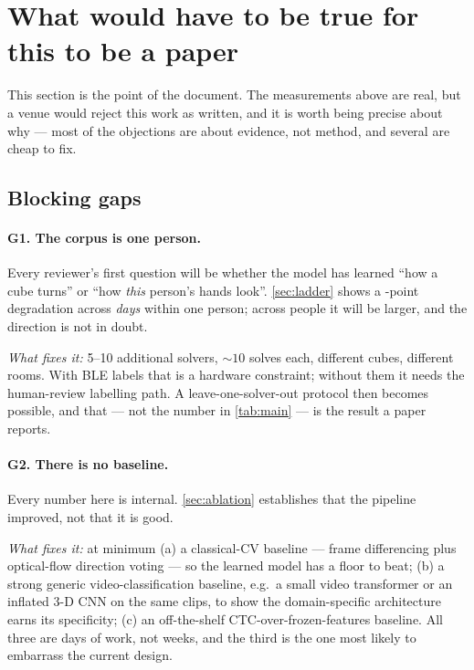 \section{What would have to be true for this to be a paper}
\label{sec:gap}

This section is the point of the document. The measurements above are real,
but a venue would reject this work as written, and it is worth being precise
about why --- most of the objections are about evidence, not method, and
several are cheap to fix.

\subsection{Blocking gaps}

\paragraph{G1. The corpus is one person.} Every reviewer's first question
will be whether the model has learned ``how a cube turns'' or ``how
\emph{this} person's hands look''. \cref{sec:ladder} shows a
\LadderTrainMinusHeld-point degradation across \emph{days} within one
person; across people it will be larger, and the direction is not in doubt.

\emph{What fixes it:} 5--10 additional solvers, ${\sim}10$ solves each,
different cubes, different rooms. With BLE labels that is a hardware
constraint; without them it needs the human-review labelling path. A
leave-one-solver-out protocol then becomes possible, and that --- not the
number in \cref{tab:main} --- is the result a paper reports.

\paragraph{G2. There is no baseline.} Every number here is internal.
\cref{sec:ablation} establishes that the pipeline improved, not that it is
good.

\emph{What fixes it:} at minimum (a) a classical-CV baseline --- frame
differencing plus optical-flow direction voting --- so the learned model has
a floor to beat; (b) a strong generic video-classification baseline, e.g.\ a
small video transformer or an inflated 3-D CNN on the same clips, to show the
domain-specific architecture earns its specificity; (c) an off-the-shelf
CTC-over-frozen-features baseline. All three are days of work, not weeks,
and the third is the one most likely to embarrass the current design.

